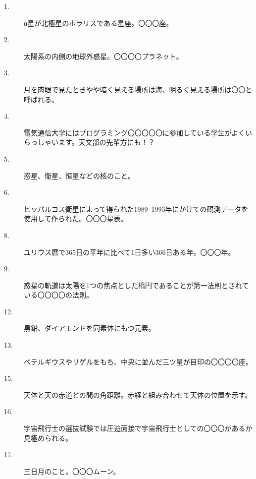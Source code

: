 \documentclass[supernova_2023]{subfiles}
\begin{document}
\vspace{3\zw}
\begin{tcolorbox}[title=たてのカギ]
  \begin{description}
  \item[1. ] α星が北極星のポラリスである星座。〇〇〇座。
  \item[2. ] 太陽系の内側の地球外惑星。〇〇〇〇プラネット。
  \item[3. ] 月を肉眼で見たときやや暗く見える場所は海、明るく見える場所は〇〇と呼ばれる。
  \item[4. ] 電気通信大学にはプログラミング〇〇〇〇〇に参加している学生がよくいらっしゃいます。天文部の先輩方にも！？
  \item[5. ] 惑星、衛星、恒星などの核のこと。
  \item[6. ] ヒッパルコス衛星によって得られた1989~1993年にかけての観測データを使用して作られた。〇〇〇星表。
  \item[8. ] ユリウス暦で365日の平年に比べて1日多い366日ある年。〇〇〇年。
  \item[9. ] 惑星の軌道は太陽を1つの焦点とした楕円であることが第一法則とされている〇〇〇〇の法則。
  \item[12. ] 黒鉛、ダイアモンドを同素体にもつ元素。
  \item[13. ] ベテルギウスやリゲルをもち、中央に並んだ三ツ星が目印の〇〇〇〇座。
  \item[15. ] 天体と天の赤道との間の角距離。赤経と組み合わせて天体の位置を示す。
  \item[16. ] 宇宙飛行士の選抜試験では圧迫面接で宇宙飛行士としての〇〇〇があるか見極められる。
  \item[17. ] 三日月のこと。〇〇〇ムーン。
  \end{description}
\end{tcolorbox}
\vspace{3\zw}
\end{document}
